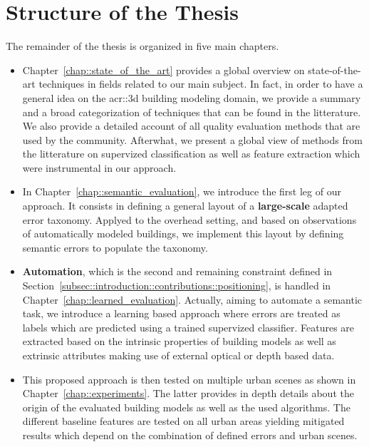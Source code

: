 \section{Structure of the Thesis}
    \label{sec::introduction::structure_of_thesis}
    The remainder of the thesis is organized in five main chapters.\\
    \begin{itemize}[label=\(\blacktriangleright\)]
        \item Chapter~\ref{chap::state_of_the_art} provides a global overview on state-of-the-art techniques in fields related to our main subject.
                In fact, in order to have a general idea on the \gls{acr::3d} building modeling domain, we provide a summary and a broad categorization of techniques that can be found in the litterature.
                We also provide a detailed account of all quality evaluation methods that are used by the community.
                Afterwhat, we present a global view of methods from the litterature on supervized classification as well as feature extraction which were instrumental in our approach.
        \item In Chapter~\ref{chap::semantic_evaluation}, we introduce the first leg of our approach.
                It consists in defining a general layout of a \textbf{large-scale} adapted error taxonomy.
                Applyed to the overhead setting, and based on observations of automatically modeled buildings, we implement this layout by defining semantic errors to populate the taxonomy.
        \item \textbf{Automation}, which is the second and remaining constraint defined in Section~\ref{subsec::introduction::contributions::positioning}, is handled in Chapter~\ref{chap::learned_evaluation}.
                Actually, aiming to automate a semantic task, we introduce a learning based approach where errors are treated as labels which are predicted using a trained supervized classifier.
                Features are extracted based on the intrinsic properties of building models as well as extrinsic attributes making use of external optical or depth based data.
        \item This proposed approach is then tested on multiple urban scenes as shown in Chapter~\ref{chap::experiments}.
                The latter provides in depth details about the origin of the evaluated building models as well as the used algorithms.
                The different baseline features are tested on all urban areas yielding mitigated results which depend on the combination of defined errors and urban scenes.

\end{itemize}
